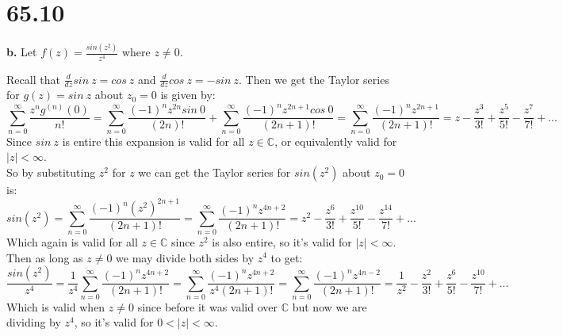 \documentclass{article}
\begin{document}
\newpage
\section*{65.10}

{\Large\textbf{b.}} Let $f(z) =\frac{sin(z^2)}{z^4}$ where $z\neq 0$.
\begin{center}
    \doublespacing
    Recall that $\frac{d}{dz} sin\:z = cos\:z$ and $\frac{d}{dz} cos\:z = -sin\:z$.
    Then we get the Taylor series for $g(z) = sin\:z$ about $z_0 = 0$ is given by:
    \[\sum _{n=0}^{\infty}\frac{z^n g^{(n)} (0)}{n!} =\sum _{n=0}^{\infty}\frac{(-1)^n z^{2n} sin\:0}{(2n)!} +\sum _{n=0}^{\infty}\frac{(-1)^n z^{2n + 1} cos\:0}{(2n+1)!} =\sum _{n=0}^{\infty}\frac{(-1)^n z^{2n + 1}}{(2n+1)!} = z -\frac{z^3}{3!} +\frac{z^5}{5!} -\frac{z^7}{7!} + ...\]
    Since $sin\:z$ is entire this expansion is valid for all $z\in\mathbb{C}$, or equivalently valid for $|z| <\infty$.
    \\So by substituting $z^2$ for $z$ we can get the Taylor series for $sin(z^2)$ about $z_0 = 0$ is:
    \[sin(z^2) =\sum _{n=0}^{\infty}\frac{(-1)^n (z^2)^{2n + 1}}{(2n+1)!} =\sum _{n=0}^{\infty}\frac{(-1)^n z^{4n + 2}}{(2n+1)!} = z^2 -\frac{z^6}{3!} +\frac{z^{10}}{5!} -\frac{z^{14}}{7!} + ...\]
    Which again is valid for all $z\in\mathbb{C}$ since $z^2$ is also entire, so it's valid for $|z| <\infty$.
    \\Then as long as $z\neq 0$ we may divide both sides by $z^4$ to get:
    \[\frac{sin(z^2)}{z^4} =\frac{1}{z^4}\sum _{n=0}^{\infty}\frac{(-1)^n z^{4n + 2}}{(2n+1)!} =\sum _{n=0}^{\infty}\frac{(-1)^n z^{4n + 2}}{z^4(2n+1)!} =\sum _{n=0}^{\infty}\frac{(-1)^n z^{4n - 2}}{(2n+1)!} =\frac{1}{z^2} -\frac{z^2}{3!} +\frac{z^6}{5!} -\frac{z^{10}}{7!} + ...\]
    Which is valid when $z\neq 0$ since before it was valid over $\mathbb{C}$ but now we are dividing by $z^4$, so it's valid for $0 < |z| <\infty$.
\end{center}


\newpage
\end{document}
